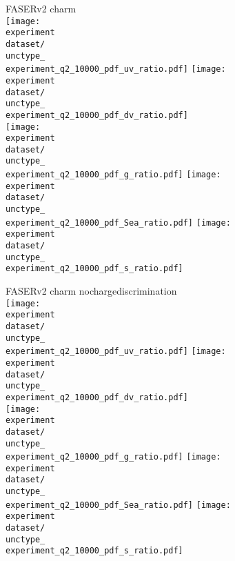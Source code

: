 \documentclass{article}
\newcommand{\figw}{70mm}
\newcommand{\experiment}{FASERv2}
\newcommand{\unctype}{systVar05}
\begin{document}
\newpage

FASERv2 charm\\
\renewcommand{\dataset}{_charm}
\texttt{[image: \\experiment\\dataset/\\unctype\_\\experiment\_q2\_10000\_pdf\_uv\_ratio.pdf]}
\texttt{[image: \\experiment\\dataset/\\unctype\_\\experiment\_q2\_10000\_pdf\_dv\_ratio.pdf]}\\
\texttt{[image: \\experiment\\dataset/\\unctype\_\\experiment\_q2\_10000\_pdf\_g\_ratio.pdf]}
\texttt{[image: \\experiment\\dataset/\\unctype\_\\experiment\_q2\_10000\_pdf\_Sea\_ratio.pdf]}
\texttt{[image: \\experiment\\dataset/\\unctype\_\\experiment\_q2\_10000\_pdf\_s\_ratio.pdf]}

\newpage

FASERv2 charm nochargediscrimination\\
\renewcommand{\dataset}{_charm_nochargediscrimination}
\texttt{[image: \\experiment\\dataset/\\unctype\_\\experiment\_q2\_10000\_pdf\_uv\_ratio.pdf]}
\texttt{[image: \\experiment\\dataset/\\unctype\_\\experiment\_q2\_10000\_pdf\_dv\_ratio.pdf]}\\
\texttt{[image: \\experiment\\dataset/\\unctype\_\\experiment\_q2\_10000\_pdf\_g\_ratio.pdf]}
\texttt{[image: \\experiment\\dataset/\\unctype\_\\experiment\_q2\_10000\_pdf\_Sea\_ratio.pdf]}
\texttt{[image: \\experiment\\dataset/\\unctype\_\\experiment\_q2\_10000\_pdf\_s\_ratio.pdf]}
\end{document}
